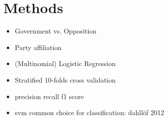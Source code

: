 \documentclass[11pt]{article}
\begin{document}
%





\section{Methods}\label{sec:methods}

\begin{itemize}
\item Government vs. Opposition
\item Party affiliation
\item (Multinomial) Logistic Regression
\item Stratified 10-folds cross validation
\item precision recall f1 score
\item svm common choice for classification: dahllöf 2012
\end{itemize}
\end{document}
